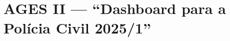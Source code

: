 \chapter[AGES II --- “Dashboard para a Polícia Civil 2025/1”]{AGES II --- “Dashboard para a Polícia Civil 2025/1”}




